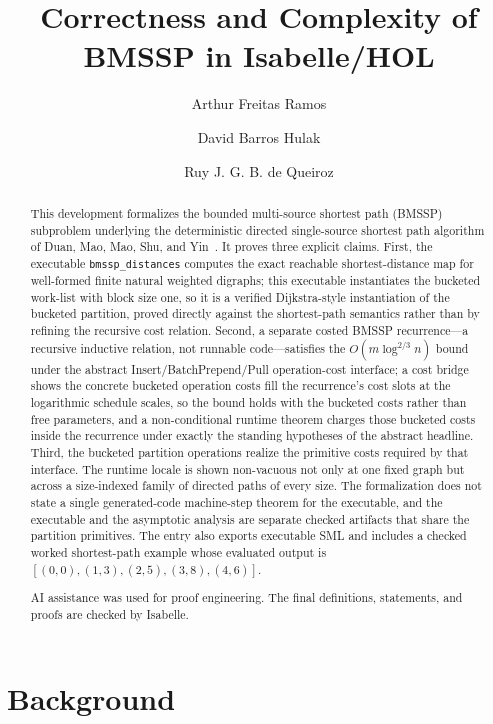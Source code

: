 \documentclass[11pt,a4paper]{article}
\begin{document}
\title{Correctness and Complexity of BMSSP in Isabelle/HOL}
\author{Arthur Freitas Ramos \and David Barros Hulak \and Ruy J. G. B. de Queiroz}
\maketitle

\begin{abstract}
This development formalizes the bounded multi-source shortest path (BMSSP)
subproblem underlying the deterministic directed single-source shortest path
algorithm of Duan, Mao, Mao, Shu, and Yin~\cite{DuanMaoMaoShuYin2025}.
It proves three explicit claims.  First, the executable
\texttt{bmssp\_distances} computes the exact reachable shortest-distance map
for well-formed finite natural weighted digraphs; this executable instantiates
the bucketed work-list with block size one, so it is a verified Dijkstra-style
instantiation of the bucketed partition, proved directly against the
shortest-path semantics rather than by refining the recursive cost relation.
Second, a separate costed BMSSP recurrence---a recursive inductive relation, not
runnable code---satisfies the \(O(m \log^{2/3} n)\) bound under the abstract
Insert/BatchPrepend/Pull operation-cost interface; a cost bridge shows the
concrete bucketed operation costs fill the recurrence's cost slots at the
logarithmic schedule scales, so the bound holds with the bucketed costs rather
than free parameters, and a non-conditional runtime theorem charges those
bucketed costs inside the recurrence under exactly the standing hypotheses of
the abstract headline.  Third, the bucketed partition operations realize the
primitive costs required by that interface.  The runtime locale is shown
non-vacuous not only at one fixed graph but across a size-indexed family of
directed paths of every size.  The formalization does not state a single
generated-code machine-step theorem for the executable, and the executable and
the asymptotic analysis are separate checked artifacts that share the partition
primitives.  The entry also exports executable SML and includes a checked worked
shortest-path example whose evaluated output is
\([(0,0),(1,3),(2,5),(3,8),(4,6)]\).

AI assistance was used for proof engineering. The final definitions,
statements, and proofs are checked by Isabelle.
\end{abstract}

\newpage
\tableofcontents
\newpage

\section{Background}
\end{document}
